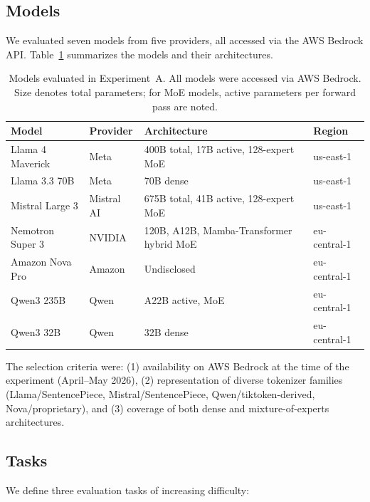 \documentclass[11pt,a4paper]{article}
\begin{document}
\subsection{Models}
\label{sec:models}

We evaluated seven models from five providers, all accessed via the AWS Bedrock API. Table~\ref{tab:models} summarizes the models and their architectures.

\begin{table}[t]
\centering
\caption{Models evaluated in Experiment~A. All models were accessed via AWS Bedrock. Size denotes total parameters; for MoE models, active parameters per forward pass are noted.}
\label{tab:models}
\begin{tabular}{llll}
\toprule
\textbf{Model} & \textbf{Provider} & \textbf{Architecture} & \textbf{Region} \\
\midrule
Llama 4 Maverick   & Meta      & 400B total, 17B active, 128-expert MoE & us-east-1 \\
Llama 3.3 70B      & Meta      & 70B dense                  & us-east-1 \\
Mistral Large 3    & Mistral AI & 675B total, 41B active, 128-expert MoE & us-east-1 \\
Nemotron Super 3   & NVIDIA    & 120B, A12B, Mamba-Transformer hybrid MoE & eu-central-1 \\
Amazon Nova Pro    & Amazon    & Undisclosed                & eu-central-1 \\
Qwen3 235B         & Qwen      & A22B active, MoE           & eu-central-1 \\
Qwen3 32B          & Qwen      & 32B dense                  & eu-central-1 \\
\bottomrule
\end{tabular}
\end{table}

The selection criteria were: (1) availability on AWS Bedrock at the time of the experiment (April--May 2026), (2) representation of diverse tokenizer families (Llama/SentencePiece, Mistral/SentencePiece, Qwen/tiktoken-derived, Nova/proprietary), and (3) coverage of both dense and mixture-of-experts architectures.

\subsection{Tasks}
\label{sec:tasks}

We define three evaluation tasks of increasing difficulty:
\end{document}
